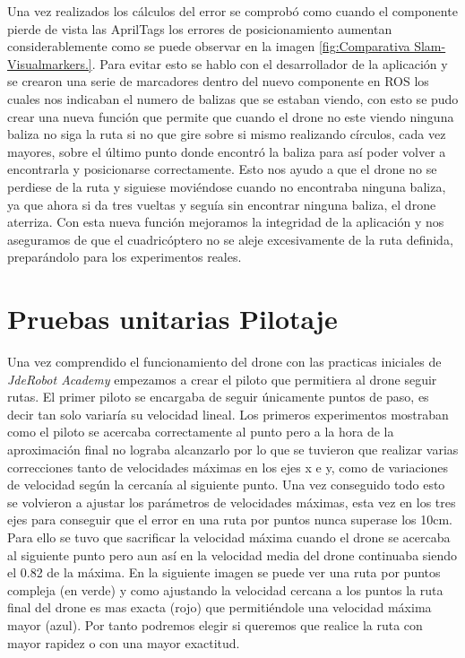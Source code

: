 \hspace{1cm} Una vez realizados los cálculos del error se comprobó como cuando el componente pierde de vista las AprilTags los errores de posicionamiento aumentan considerablemente como se puede observar en la imagen \ref{fig:Comparativa Slam-Visualmarkers.}. Para evitar esto se hablo con el desarrollador de la aplicación y se crearon una serie de  marcadores dentro del nuevo componente en ROS los cuales nos indicaban el numero de balizas que se estaban viendo, con esto se pudo crear una nueva función que permite que cuando el drone no este viendo ninguna baliza no siga la ruta si no que gire sobre si mismo realizando círculos, cada vez mayores, sobre el último punto donde encontró la baliza para así poder volver a encontrarla y posicionarse correctamente. Esto nos ayudo a que el drone no se perdiese de la ruta y siguiese moviéndose cuando no encontraba ninguna baliza, ya que ahora si da tres vueltas y seguía sin encontrar ninguna baliza, el drone aterriza. Con esta nueva función mejoramos la integridad de la aplicación y nos aseguramos de que el cuadricóptero no se aleje excesivamente de la ruta definida, preparándolo para los experimentos reales.

\section{Pruebas unitarias Pilotaje}
\hspace{1cm} Una vez comprendido el funcionamiento del drone con las practicas iniciales de \textit{JdeRobot Academy} empezamos a crear el piloto que permitiera al drone seguir rutas. El primer piloto se encargaba de seguir únicamente puntos de paso, es decir tan solo variaría su velocidad lineal. Los primeros experimentos mostraban como el piloto se acercaba correctamente al punto pero a la hora de la aproximación final no lograba alcanzarlo por lo que se tuvieron que realizar varias correcciones tanto de velocidades máximas en los ejes x e y, como de variaciones de velocidad según la cercanía al siguiente punto. Una vez conseguido todo esto se volvieron a ajustar los parámetros  de velocidades máximas, esta vez en los tres ejes para conseguir que el error en una ruta por puntos nunca superase los 10cm. Para ello se tuvo que sacrificar la velocidad máxima cuando el drone se acercaba al siguiente punto pero aun así en la velocidad media del drone continuaba siendo el 0.82 de la máxima. En la siguiente imagen se puede ver una ruta por puntos compleja (en verde) y como ajustando la velocidad cercana a los puntos la ruta final del drone es mas exacta (rojo) que permitiéndole una velocidad máxima mayor (azul). Por tanto podremos elegir si queremos que realice la ruta con mayor rapidez o con una mayor exactitud.

